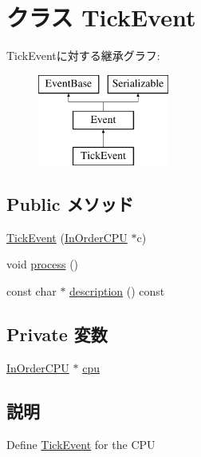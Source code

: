 \hypertarget{classInOrderCPU_1_1TickEvent}{
\section{クラス TickEvent}
\label{classInOrderCPU_1_1TickEvent}
}
TickEventに対する継承グラフ:\begin{figure}[H]
\begin{center}
\leavevmode
\includegraphics[height=3cm]{classInOrderCPU_1_1TickEvent}
\end{center}
\end{figure}
\subsection*{Public メソッド}
\begin{DoxyCompactItemize}
\item 
\hyperlink{classInOrderCPU_1_1TickEvent_a91e781d00e5f088fc04009180b13cadb}{TickEvent} (\hyperlink{classInOrderCPU_1_1InOrderCPU}{InOrderCPU} $\ast$c)
\item 
void \hyperlink{classInOrderCPU_1_1TickEvent_a2e9c5136d19b1a95fc427e0852deab5c}{process} ()
\item 
const char $\ast$ \hyperlink{classInOrderCPU_1_1TickEvent_a5a14fe478e2393ff51f02e9b7be27e00}{description} () const 
\end{DoxyCompactItemize}
\subsection*{Private 変数}
\begin{DoxyCompactItemize}
\item 
\hyperlink{classInOrderCPU_1_1InOrderCPU}{InOrderCPU} $\ast$ \hyperlink{classInOrderCPU_1_1TickEvent_a41d682c28d0f49e04393c52815808782}{cpu}
\end{DoxyCompactItemize}


\subsection{説明}
Define \hyperlink{classInOrderCPU_1_1TickEvent}{TickEvent} for the CPU 

